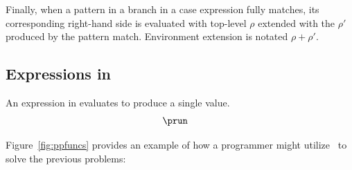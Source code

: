 \documentclass[manuscript,screen,review, 12pt, nonacm]{acmart}
\begin{document}
Finally, when a pattern in a branch in a case expression fully matches, its
corresponding right-hand side is evaluated with top-level $\rho$ extended with
the $\rho'$ produced by the pattern match. Environment extension is notated
$\rho + \rho'$. 

\subsection{Expressions in \PPlus}

    An expression in {\PPlus} evaluates to produce a single value. 
    \begin{align*}
        &\prun
    \end{align*}
    
    \ppsemantics 
      
      \bigskip 

    
    Figure~\ref{fig:ppfuncs} provides an example of how a programmer might utilize
    \PPlus\ to solve the previous problems: 
\end{document}
